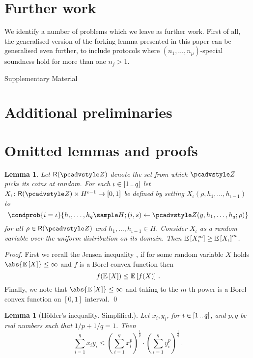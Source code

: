\let\accentvec\vec \documentclass[runningheads,10pt]{llncs}
\newtheorem{lemma}[theorem]{Lemma}
\begin{document}
\section{Further work}
We identify a number of problems which we leave as further work. First of all,
the generalised version of the forking lemma presented in this paper can be
generalised even further, to include protocols where $(n_1, \ldots,
n_\mu)$-special soundness hold for more than one $n_j > 1$. 



\clearpage
\appendix
{\Huge{Supplementary Material}}
\section{Additional preliminaries}

\section{Omitted lemmas and proofs}
\begin{lemma}\label{lem:jensen}
	Let $\RND{\zdv}$ denote the set from which $\zdv$ picks its coins at random.
	For each $\iota \in [1 \, .. \, q]$ let $X_\iota \colon \RND{\zdv} \times
	H^{\iota - 1} \to [0, 1]$ be defined by setting $X_\iota(\rho, h_1, \ldots,
h_{\iota - 1})$ to 
	\[
		\condprob{i = \iota}{h_\iota, \ldots, h_q \sample H; (i, s) \gets \zdv(y, h_1, \ldots, h_q; \rho)} 
	\] 
	for all $\rho \in \RND{\zdv}$ and $h_1, \ldots, h_{\iota - 1} \in H$. Consider $X_\iota$ as a random variable over the uniform distribution on its domain. 
	Then $\mathbb{E}\left[X_\iota^m\right] \geq \mathbb{E}\left[X_\iota\right]^m$.
\end{lemma}
\begin{proof}
	First we recall the Jensen inequality \cite{W:Weissten20}, if for some random variable $X$ holds $\abs{\expected{X}} \leq \infty$ and $f$ is a Borel convex function then 
	\[
		f(\mathbb{E}\left[X\right]) \leq \mathbb{E}\left[f(X)\right]\,.
	\] 
	Finally, we note that $\abs{\expected{X}} \leq \infty$ and taking to the $m$-th power is a Borel convex function on $[0, 1]$ interval. 
	\qed
\end{proof}

\begin{lemma}[H\"older's inequality. Simplified.]\label{lem:holder}
	Let $x_i, y_i$, for $i \in [1 \, .. \, q]$, and $p, q$ be real numbers such that $1/p + 1/q = 1$. Then
	\[
		\sum_{i = 1}^{q} x_i y_i \leq \left(\sum_{i = 1}^{q} x_i^p\right)^{\frac{1}{p}} \cdot \left(\sum_{i = 1}^{q} y_i^p\right)^{\frac{1}{q}}\,.
	\]
\end{lemma}
\end{document}
